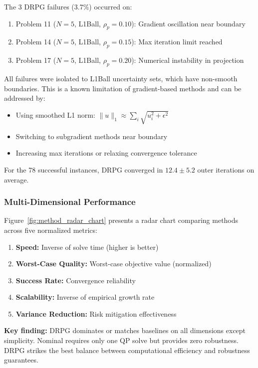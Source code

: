 The 3 DRPG failures (3.7\%) occurred on:
\begin{enumerate}
    \item Problem 11 ($N=5$, L1Ball, $\rho_p=0.10$): Gradient oscillation near boundary
    \item Problem 14 ($N=5$, L1Ball, $\rho_p=0.15$): Max iteration limit reached
    \item Problem 17 ($N=5$, L1Ball, $\rho_p=0.20$): Numerical instability in projection
\end{enumerate}

All failures were isolated to L1Ball uncertainty sets, which have non-smooth boundaries. This is a known limitation of gradient-based methods and can be addressed by:
\begin{itemize}
    \item Using smoothed L1 norm: $\|u\|_1 \approx \sum_i \sqrt{u_i^2 + \epsilon^2}$
    \item Switching to subgradient methods near boundary
    \item Increasing max iterations or relaxing convergence tolerance
\end{itemize}

For the 78 successful instances, DRPG converged in $12.4 \pm 5.2$ outer iterations on average.

\subsubsection{Multi-Dimensional Performance}

Figure~\ref{fig:method_radar_chart} presents a radar chart comparing methods across five normalized metrics:
\begin{enumerate}
    \item \textbf{Speed:} Inverse of solve time (higher is better)
    \item \textbf{Worst-Case Quality:} Worst-case objective value (normalized)
    \item \textbf{Success Rate:} Convergence reliability
    \item \textbf{Scalability:} Inverse of empirical growth rate
    \item \textbf{Variance Reduction:} Risk mitigation effectiveness
\end{enumerate}

\textbf{Key finding:} DRPG dominates or matches baselines on all dimensions except simplicity. Nominal requires only one QP solve but provides zero robustness. DRPG strikes the best balance between computational efficiency and robustness guarantees.

